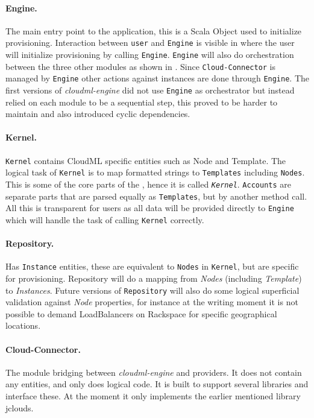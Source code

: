 \paragraph{Engine.} 




The main entry point to the application, this is a Scala Object used to initialize provisioning.
Interaction between \texttt{user} and \texttt{Engine} is visible in  
where the user will initialize provisioning by calling \texttt{Engine}.
\texttt{Engine} will also do orchestration between the three other modules
as shown in .
Since \texttt{Cloud-Connector} is managed by \texttt{Engine} other actions against 
instances are done through \texttt{Engine}.
The first versions of \emph{cloudml-engine} did not use \texttt{Engine} as orchestrator but
instead relied on each module to be a sequential step, this proved to be harder to maintain
and also introduced cyclic dependencies.

\paragraph{Kernel.} 

\texttt{Kernel} contains CloudML specific entities such as Node and Template.
The logical task of \texttt{Kernel} is to map  formatted strings to 
\texttt{Templates} including \texttt{Nodes}.
This is some of the core parts of the , hence it is called \emph{\texttt{Kernel}}.
\texttt{Accounts} are separate parts that are parsed equally as \texttt{Templates},
 but by another method call. All this is transparent for users as all data will
be provided directly to \texttt{Engine} which will handle the task
of calling \texttt{Kernel} correctly.

\paragraph{Repository.} 

Has \texttt{Instance} entities, these are equivalent to \texttt{Nodes} in \texttt{Kernel},
but are specific for provisioning. Repository will do a mapping from \emph{Nodes} (including \emph{Template})
to \emph{Instances}. Future versions of \texttt{Repository} will also do some logical superficial validation
against \emph{Node} properties, for instance at the writing moment it is not possible to 
demand LoadBalancers on Rackspace for specific geographical locations.

\paragraph{Cloud-Connector.} 

The module bridging between \emph{cloudml-engine} and providers.
It does not contain any entities, and only does logical code. 
It is built to support several libraries and interface these. At the moment it only implements the earlier
mentioned library jclouds.


